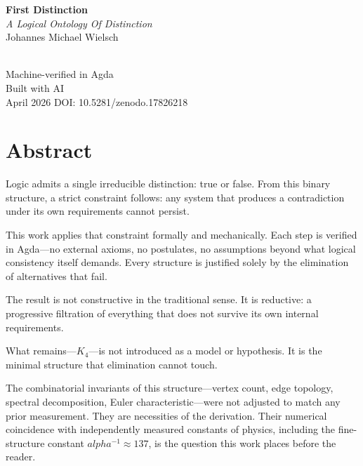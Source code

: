 \documentclass[11pt,a4paper]{book}
\def\alpha{alpha}%
\begin{document}
\begin{titlepage}
\centering
\vspace*{3cm}
{\Huge\bfseries First Distinction}\\[0.5cm]
{\Large\itshape A Logical Ontology Of Distinction}\\[2cm]
{\large Johannes Michael Wielsch}\\[4cm]
\\[4cm]
{\small Machine-verified in Agda}\\
{\small Built with AI}\\
\vfill
{\small April 2026}
{\small DOI: 10.5281/zenodo.17826218}\\[0.5cm]
\end{titlepage}

\frontmatter
\chapter*{Abstract}

Logic admits a single irreducible distinction: true or false. From this binary structure, a strict constraint follows: any system that produces a contradiction under its own requirements cannot persist.

This work applies that constraint formally and mechanically. Each step is verified in Agda—no external axioms, no postulates, no assumptions beyond what logical consistency itself demands. Every structure is justified solely by the elimination of alternatives that fail.

The result is not constructive in the traditional sense. It is reductive: a progressive filtration of everything that does not survive its own internal requirements.

What remains—$K_4$—is not introduced as a model or hypothesis. It is the minimal structure that elimination cannot touch.

The combinatorial invariants of this structure---vertex count, edge topology, spectral decomposition, Euler characteristic---were not adjusted to match any prior measurement. They are necessities of the derivation. Their numerical coincidence with independently measured constants of physics, including the fine-structure constant $\alpha^{-1} \approx 137$, is the question this work places before the reader.
\end{document}
